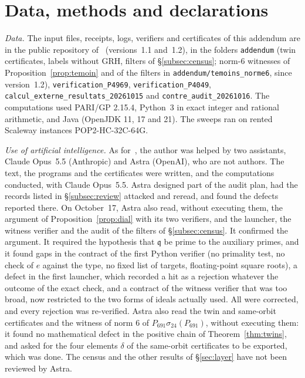 \documentclass[11pt,a4paper]{amsart}
\theoremstyle{plain}
\theoremstyle{definition}
\newcommand{\q}{\mathfrak{q}}
\begin{document}
\section*{Data, methods and declarations}
\emph{Data.} The input files, receipts, logs, verifiers and certificates of this addendum are in the public repository of~\cite{Gau26} (versions~1.1 and~1.2), in the folders \texttt{addendum} (twin certificates, labels without GRH, filters of \S\ref{subsec:census}; norm-$6$ witnesses of Proposition~\ref{prop:temoin} and of the filters in \texttt{addendum/temoins\_norme6}, since version~1.2), \texttt{verification\_P4969}, \texttt{verification\_P4049}, \texttt{calcul\_externe\_resultats\_20261015} and \texttt{contre\_audit\_20261016}. The computations used PARI/GP 2.15.4, Python~3 in exact integer and rational arithmetic, and Java (OpenJDK 11, 17 and 21). The sweeps ran on rented Scaleway instances POP2-HC-32C-64G.

\emph{Use of artificial intelligence.} As for~\cite{Gau26}, the author was helped by two assistants, Claude Opus~5.5 (Anthropic) and Astra (OpenAI), who are not authors. The text, the programs and the certificates were written, and the computations conducted, with Claude Opus~5.5. Astra designed part of the audit plan, had the records listed in \S\ref{subsec:review} attacked and reread, and found the defects reported there. On October~17, Astra also read, without executing them, the argument of Proposition~\ref{prop:dial} with its two verifiers, and the launcher, the witness verifier and the audit of the filters of \S\ref{subsec:census}. It confirmed the argument. It required the hypothesis that $\q$ be prime to the auxiliary primes, and it found gaps in the contract of the first Python verifier (no primality test, no check of $e$ against the type, no fixed list of targets, floating-point square roots), a defect in the first launcher, which recorded a hit as a rejection whatever the outcome of the exact check, and a contract of the witness verifier that was too broad, now restricted to the two forms of ideals actually used. All were corrected, and every rejection was re-verified. Astra also read the twin and same-orbit certificates and the witness of norm $6$ of $P_{691}\sigma_{24}(P_{691})$, without executing them: it found no mathematical defect in the positive chain of Theorem~\ref{thm:twins}, and asked for the four elements $\delta$ of the same-orbit certificates to be exported, which was done. The census and the other results of \S\ref{sec:layer} have not been reviewed by Astra.
\end{document}
